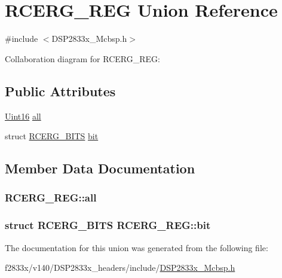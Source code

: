\hypertarget{union_r_c_e_r_g___r_e_g}{}\section{R\+C\+E\+R\+G\+\_\+\+R\+E\+G Union Reference}
\label{union_r_c_e_r_g___r_e_g}


{\ttfamily \#include $<$D\+S\+P2833x\+\_\+\+Mcbsp.\+h$>$}



Collaboration diagram for R\+C\+E\+R\+G\+\_\+\+R\+E\+G\+:
\subsection*{Public Attributes}
\begin{DoxyCompactItemize}
\item 
\hyperlink{_d_s_p2833x___device_8h_a59a9f6be4562c327cbfb4f7e8e18f08b}{Uint16} \hyperlink{union_r_c_e_r_g___r_e_g_a61c1a034b526ae73361df996b251e92d}{all}
\item 
struct \hyperlink{struct_r_c_e_r_g___b_i_t_s}{R\+C\+E\+R\+G\+\_\+\+B\+I\+T\+S} \hyperlink{union_r_c_e_r_g___r_e_g_a5ecc51385ffc0459b4517e2620568bcf}{bit}
\end{DoxyCompactItemize}


\subsection{Member Data Documentation}
\hypertarget{union_r_c_e_r_g___r_e_g_a61c1a034b526ae73361df996b251e92d}{}
\subsubsection[{all}]{ R\+C\+E\+R\+G\+\_\+\+R\+E\+G\+::all}\label{union_r_c_e_r_g___r_e_g_a61c1a034b526ae73361df996b251e92d}
\hypertarget{union_r_c_e_r_g___r_e_g_a5ecc51385ffc0459b4517e2620568bcf}{}
\subsubsection[{bit}]{\setlength{\rightskip}{0pt plus 5cm}struct {\bf R\+C\+E\+R\+G\+\_\+\+B\+I\+T\+S} R\+C\+E\+R\+G\+\_\+\+R\+E\+G\+::bit}\label{union_r_c_e_r_g___r_e_g_a5ecc51385ffc0459b4517e2620568bcf}


The documentation for this union was generated from the following file\+:\begin{DoxyCompactItemize}
\item 
f2833x/v140/\+D\+S\+P2833x\+\_\+headers/include/\hyperlink{_d_s_p2833x___mcbsp_8h}{D\+S\+P2833x\+\_\+\+Mcbsp.\+h}\end{DoxyCompactItemize}
